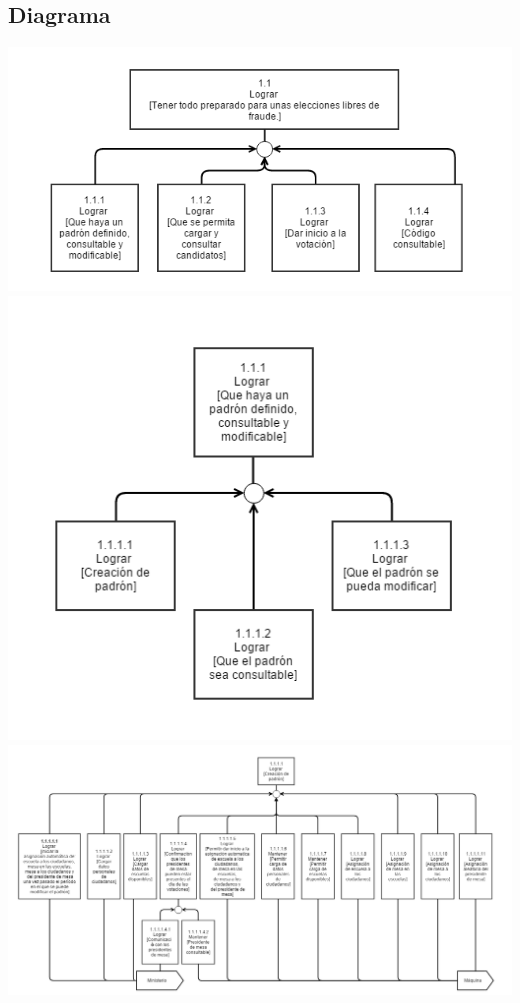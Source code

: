 \newpage
\subsection{Diagrama}

\includegraphics[scale=0.55]{imagenes/Diagramas/11/11.png}
\\
\includegraphics[scale=0.55]{imagenes/Diagramas/11/111.png}
\\
\includegraphics[scale=0.45]{imagenes/Diagramas/11/1111.png}
